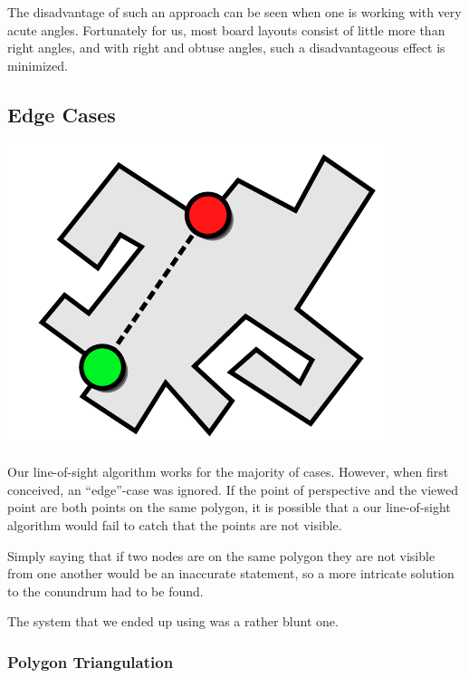 \documentclass[letterpaper, 12pt]{article}
\begin{document}
\begin{multicols}{2}
The disadvantage of such an approach can be seen when one is working with very
acute angles. Fortunately for us, most board layouts consist of little more than
right angles, and with right and obtuse angles, such a disadvantageous effect is
minimized.

\subsection{Edge Cases}

\includegraphics[width=\columnwidth]{img/line_of_sight_flaw.pdf}

Our line-of-sight algorithm works for the majority of cases. However, when first
conceived, an ``edge''-case was ignored. If the point of perspective and the
viewed point are both points on the same polygon, it is possible that a our
line-of-sight algorithm would fail to catch that the points are not visible.

Simply saying that if two nodes are on the same polygon they are not visible
from one another would be an inaccurate statement, so a more intricate solution
to the conundrum had to be found.

The system that we ended up using was a rather blunt one.

\subsubsection{Polygon Triangulation}


\end{multicols}
\end{document}
